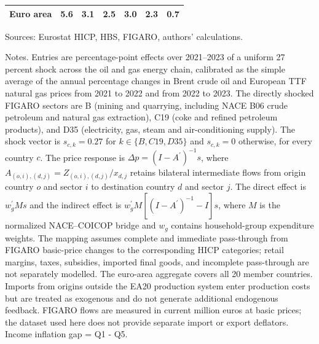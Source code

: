 \begin{table}[H]
\begin{tabular}{lrrrrrr}
 \\
\midrule
\textbf{Euro area} & \textbf{5.6} & \textbf{3.1} & \textbf{2.5} & \textbf{3.0} & \textbf{2.3} & \textbf{0.7}
 \\
\bottomrule
\end{tabular}
\par\vspace{0.35em}\footnotesize\noindent Sources: Eurostat HICP, HBS, FIGARO, authors' calculations.
\par\vspace{0.25em}\footnotesize\noindent Notes. Entries are percentage-point effects over 2021--2023 of a uniform 27 percent shock across the oil and gas energy chain, calibrated as the simple average of the annual percentage changes in Brent crude oil and European TTF natural gas prices from 2021 to 2022 and from 2022 to 2023. The directly shocked FIGARO sectors are B (mining and quarrying, including NACE B06 crude petroleum and natural gas extraction), C19 (coke and refined petroleum products), and D35 (electricity, gas, steam and air-conditioning supply). The shock vector is $s_{c,k}=0.27$ for $k\in\{B,C19,D35\}$ and $s_{c,k}=0$ otherwise, for every country $c$. The price response is $\Delta p = (I - A^{\prime})^{-1}s$, where $A_{(o,i),(d,j)}=Z_{(o,i),(d,j)}/x_{d,j}$ retains bilateral intermediate flows from origin country $o$ and sector $i$ to destination country $d$ and sector $j$. The direct effect is $w_g^{\prime}Ms$ and the indirect effect is $w_g^{\prime}M[(I-A^{\prime})^{-1}-I]s$, where $M$ is the normalized NACE--COICOP bridge and $w_g$ contains household-group expenditure weights. The mapping assumes complete and immediate pass-through from FIGARO basic-price changes to the corresponding HICP categories; retail margins, taxes, subsidies, imported final goods, and incomplete pass-through are not separately modelled. The euro-area aggregate covers all 20 member countries. Imports from origins outside the EA20 production system enter production costs but are treated as exogenous and do not generate additional endogenous feedback. FIGARO flows are measured in current million euros at basic prices; the dataset used here does not provide separate import or export deflators. Income inflation gap = Q1 - Q5.
\end{table}
\vspace{0.6em}
